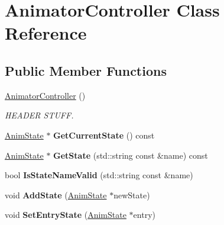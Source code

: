 \hypertarget{classAnimatorController}{}\section{Animator\+Controller Class Reference}
\label{classAnimatorController}
\subsection*{Public Member Functions}
\begin{DoxyCompactItemize}
\item 
\mbox{\label{classAnimatorController_a9b32e8e7a4b72e80c6ae7a88fc961c4e}} 
\hyperlink{classAnimatorController_a9b32e8e7a4b72e80c6ae7a88fc961c4e}{Animator\+Controller} ()
\begin{DoxyCompactList}\small\item\em H\+E\+A\+D\+ER S\+T\+U\+FF. \end{DoxyCompactList}\item 
\mbox{\label{classAnimatorController_ae84a0064dd344fb2a2b4bb6de69557e1}} 
\hyperlink{structAnimState}{Anim\+State} $\ast$ {\bfseries Get\+Current\+State} () const
\item 
\mbox{\label{classAnimatorController_aa2b6d02748cb880d596122448f685f9f}} 
\hyperlink{structAnimState}{Anim\+State} $\ast$ {\bfseries Get\+State} (std\+::string const \&name) const
\item 
\mbox{\label{classAnimatorController_ac079dc6e19c4284fa941033577ddd45d}} 
bool {\bfseries Is\+State\+Name\+Valid} (std\+::string const \&name)
\item 
\mbox{\label{classAnimatorController_a7e2acba88b4bc663c3bc3a04c20962c8}} 
void {\bfseries Add\+State} (\hyperlink{structAnimState}{Anim\+State} $\ast$new\+State)
\item 
\mbox{\label{classAnimatorController_adec385ab87a34b0919a040b1540f8b86}} 
void {\bfseries Set\+Entry\+State} (\hyperlink{structAnimState}{Anim\+State} $\ast$entry)
\item 
\mbox{\label{classAnimatorController_a4717fb9e8e96c4cd7fff48ed38db6ae8}} 

\end{DoxyCompactItemize}
